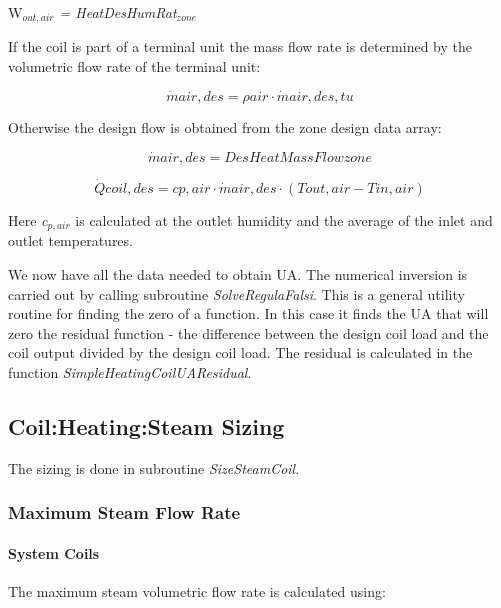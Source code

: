 W\emph{\(_{out,air}\) = HeatDesHumRat\(_{zone}\)}

If the coil is part of a terminal unit the mass flow rate is determined by the volumetric flow rate of the terminal unit:

\begin{equation}
\dot mair,des = \rho air\cdot \dot mair,des,tu
\end{equation}

Otherwise the design flow is obtained from the zone design data array:

\begin{equation}
\dot mair,des = DesHeatMassFlowzone
\end{equation}

\begin{equation}
\dot Qcoil,des = cp,air\cdot \dot mair,des\cdot (Tout,air - Tin,air)
\end{equation}

Here \emph{c\(_{p,air}\)} is calculated at the outlet humidity and the average of the inlet and outlet temperatures.

We now have all the data needed to obtain UA. The numerical inversion is carried out by calling subroutine \emph{SolveRegulaFalsi}. This is a general utility routine for finding the zero of a function. In this case it finds the UA that will zero the residual function - the difference between the design coil load and the coil output divided by the design coil load. The residual is calculated in the function \emph{SimpleHeatingCoilUAResidual}.

\subsection{Coil:Heating:Steam Sizing}\label{coilheatingsteam-sizing}

The sizing is done in subroutine \emph{SizeSteamCoil}.

\subsubsection{Maximum Steam Flow Rate}\label{maximum-steam-flow-rate}

\paragraph{System Coils}\label{system-coils-2}

The maximum steam volumetric flow rate is calculated using:

